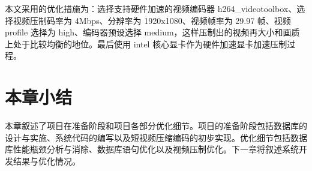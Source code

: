 本文采用的优化措施为：选择支持硬件加速的视频编码器 h264\_videotoolbox、选择视频压制码率为 4Mbps、分辨率为 1920x1080、视频帧率为 29.97 帧、视频 profile 选择为 high、编码器预设选择 medium，这样压制出的视频再大小和画质上处于比较均衡的地位。最后使用 intel 核心显卡作为硬件加速显卡加速压制过程。

\section{本章小结}
本章叙述了项目在准备阶段和项目各部分优化细节。项目的准备阶段包括数据库的设计与实施、系统代码的编写以及短视频压缩编码的初步实现。优化细节包括数据库性能瓶颈分析与消除、数据库语句优化以及视频压制优化。下一章将叙述系统开发结果与优化情况。